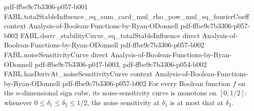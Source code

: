 \begin{theorem}
  {pdf-ffbe9c7b3306-p057-b001}
\proofstep
  {FABL.totalStableInfluence_eq_sum_card_mul_rho_pow_mul_sq_fourierCoeff}
  {context}
  {Analysis-of-Boolean-Functions-by-Ryan-ODonnell}
  {pdf-ffbe9c7b3306-p057-b002}
\proofstep
  {FABL.deriv_stabilityCurve_eq_totalStableInfluence}
  {direct}
  {Analysis-of-Boolean-Functions-by-Ryan-ODonnell}
  {pdf-ffbe9c7b3306-p057-b002}
\proofstep
  {FABL.noiseSensitivityCurve}
  {direct}
  {Analysis-of-Boolean-Functions-by-Ryan-ODonnell}
  {pdf-ffbe9c7b3306-p017-b003,
    pdf-ffbe9c7b3306-p054-b002}
\proofstep
  {FABL.hasDerivAt_noiseSensitivityCurve}
  {context}
  {Analysis-of-Boolean-Functions-by-Ryan-ODonnell}
  {pdf-ffbe9c7b3306-p057-b002}
For every Boolean function $f$ on the $n$-dimensional sign cube, its noise-sensitivity
curve is monotone on $[0,1/2]$: whenever $0\le \delta_1\le\delta_2\le 1/2$, the noise
sensitivity at $\delta_1$ is at most that at $\delta_2$.
\end{theorem}
